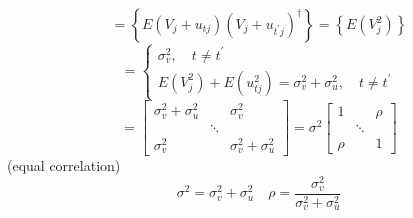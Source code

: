 \documentclass{article}
\begin{document}
\begin{equation*}
=\left\{ E\left( V_{j}+u_{tj}\right) \left( V_{j}+u_{t^{\prime }j}\right)
^{\dagger }\right\} =\left\{ E\left( V_{j}^{2}\right) \right\}
\end{equation*}%
\begin{equation*}
=\left\{ 
\begin{array}{c}
\sigma _{v}^{2},\quad t\neq t^{\prime } \\ 
E\left( V_{j}^{2}\right) +E\left( u_{tj}^{2}\right) =\sigma _{v}^{2}+\sigma
_{u}^{2},\quad t\neq t^{\prime }%
\end{array}%
\right.
\end{equation*}%
\begin{equation*}
=\left[ 
\begin{array}{ccc}
\sigma _{v}^{2}+\sigma _{u}^{2} &  & \sigma _{v}^{2} \\ 
& \ddots &  \\ 
\sigma _{v}^{2} &  & \sigma _{v}^{2}+\sigma _{u}^{2}%
\end{array}%
\right] =\sigma ^{2}\left[ 
\begin{array}{ccc}
1 &  & \rho \\ 
& \ddots &  \\ 
\rho &  & 1%
\end{array}%
\right]
\end{equation*}%
(equal correlation)%
\begin{equation*}
\sigma ^{2}=\sigma _{v}^{2}+\sigma _{u}^{2}\quad \rho =\frac{\sigma _{v}^{2}%
}{\sigma _{v}^{2}+\sigma _{u}^{2}}
\end{equation*}
\end{document}

